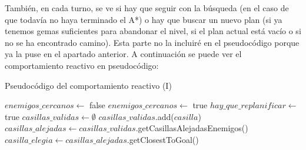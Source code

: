 \documentclass[11pt,a4paper]{article}
\begin{document}
También, en cada turno, se ve si hay que seguir con la búsqueda (en el caso de que todavía no haya
terminado el A*) o hay que buscar un nuevo plan (si ya tenemos gemas suficientes para abandonar el nivel,
si el plan actual está vacío o si no se ha encontrado camino). Esta parte no la incluiré en el
pseudocódigo porque ya la puse en el apartado anterior. A continuación se puede ver el comportamiento
reactivo en pseudocódigo:

\begin{algorithm}[H]
\caption{Pseudocódigo del comportamiento reactivo (I)}
\begin{algorithmic}[1]
\State $enemigos\_cercanos \gets $ false
	\State {}
	\State {}
		\State $enemigos\_cercanos \gets$ true
	\EndIf
\EndFor
{}
	\State $hay\_que\_replanificar \gets$ true
	\State $casillas\_validas \gets \emptyset$
			\State $casillas\_validas$.add($casilla$)
		\EndIf
	\EndFor	
		\State $casillas\_alejadas \gets casillas\_validas$.getCasillasAlejadasEnemigos()
			\State $casilla\_elegia \gets casillas\_alejadas$.getClosestToGoal()
		\Else

\end{algorithmic}
\end{algorithm}
\end{document}
